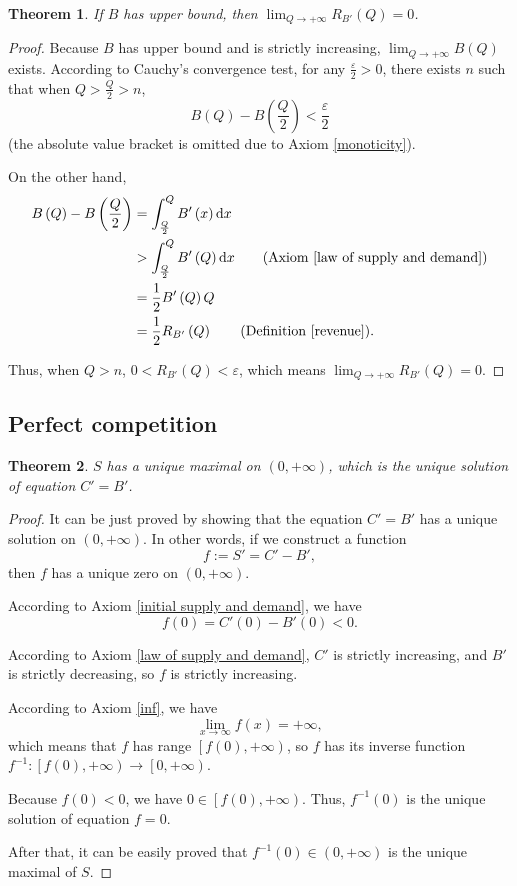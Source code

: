\documentclass{article}
\newtheorem{theorem}{Theorem}
\begin{document}
\begin{theorem}
If $B$ has upper bound, then $\lim_{Q\to+\infty}R_{B'}\left(Q\right)=0$.
\end{theorem}
\begin{proof}
Because $B$ has upper bound and is strictly increasing, $\lim_{Q\to+\infty}B\left(Q\right)$ exists.
According to Cauchy's convergence test, for any $\frac\varepsilon2>0$, there exists $n$ such that
when $Q>\frac Q2>n$,
$$B\left(Q\right)-B\left(\frac Q2\right)<\frac\varepsilon2$$
(the absolute value bracket is omitted due to Axiom \ref{monoticity}).

On the other hand,
\begin{align*}
B\left(Q\right)-B\left(\frac Q2\right)&=\int_{\frac Q2}^QB'\left(x\right)\mathrm dx\\
&>\int_{\frac Q2}^QB'\left(Q\right)\mathrm dx\qquad\text{(Axiom \ref{law of supply and demand})}\\
&=\frac12B'\left(Q\right)Q\\
&=\frac12R_{B'}\left(Q\right)\qquad\text{(Definition \ref{revenue})}.
\end{align*}

Thus, when $Q>n$, $0<R_{B'}\left(Q\right)<\varepsilon$, which means $\lim_{Q\to+\infty}R_{B'}\left(Q\right)=0$.
\end{proof}

\subsection{Perfect competition}

\begin{theorem}
\label{perfect competition equilibrium}
$S$ has a unique maximal on $\left(0,+\infty\right)$,
which is the unique solution of equation $C'=B'$.
\end{theorem}
\begin{proof}
It can be just proved by showing that the equation $C'=B'$ has a unique solution on $\left(0,+\infty\right)$.
In other words, if we construct a function $$f:=S'=C'-B',$$ then $f$ has a unique zero on $\left(0,+\infty\right)$.

According to Axiom \ref{initial supply and demand}, we have
$$f\left(0\right)=C'\left(0\right)-B'\left(0\right)<0.$$

According to Axiom \ref{law of supply and demand}, $C'$ is strictly increasing, and $B'$ is strictly decreasing, so $f$ is strictly increasing.

According to Axiom \ref{inf}, we have
$$\lim_{x\to\infty}f\left(x\right)=+\infty,$$
which means that $f$ has range $\left[f\left(0\right),+\infty\right)$,
so $f$ has its inverse function $f^{-1}:\left[f\left(0\right),+\infty\right)\to\left[0,+\infty\right)$.

Because $f\left(0\right)<0$, we have $0\in\left[f\left(0\right),+\infty\right)$.
Thus, $f^{-1}\left(0\right)$ is the unique solution of equation $f=0$.

After that, it can be easily proved that $f^{-1}\left(0\right)\in\left(0,+\infty\right)$ is the unique maximal of $S$.
\end{proof}
\end{document}
